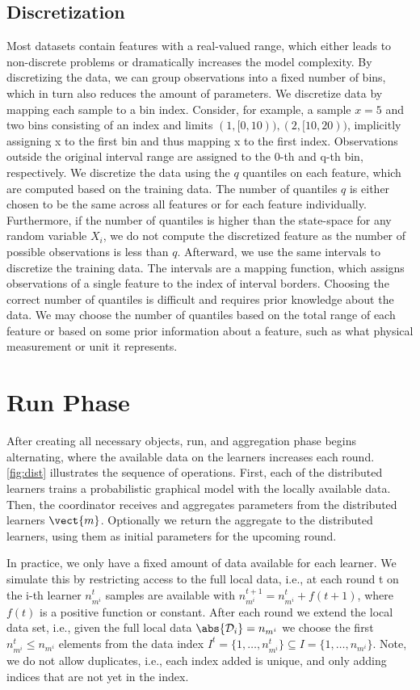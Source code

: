 \subsection{Discretization}
Most datasets contain features with a real-valued range, which either leads to non-discrete problems or dramatically increases the model complexity.
By discretizing the data, we can group observations into a fixed number of bins, which in turn also reduces the amount of parameters.
We discretize data by mapping each sample to a bin index.
Consider, for example, a sample $x=5$ and two bins consisting of an index and limits $(1,[0,10)),(2,[10,20))$, implicitly assigning x to the first bin and thus mapping x to the first index. 
Observations outside the original interval range are assigned to the 0-th and q-th bin, respectively.
We discretize the data using the $q$ quantiles on each feature, which are computed based on the training data. 
The number of quantiles $q$ is either chosen to be the same across all features or for each feature individually.
Furthermore, if the number of quantiles is higher than the state-space for any random variable $X_i$, we do not compute the discretized feature as the number of possible observations is less than $q$.
Afterward, we use the same intervals to discretize the training data.
The intervals are a mapping function, which assigns observations of a single feature to the index of interval borders. 
Choosing the correct number of quantiles is difficult and requires prior knowledge about the data.
We may choose the number of quantiles based on the total range of each feature or based on some prior information about a feature, such as what physical measurement or unit it represents.

\section{Run Phase}
After creating all necessary objects, run, and aggregation phase begins alternating, where the available data on the learners increases each round.
\autoref{fig:dist} illustrates the sequence of operations.
First, each of the distributed learners trains a probabilistic graphical model with the locally available data.  
Then, the coordinator receives and aggregates parameters from the distributed learners $\vect{m}$. 
Optionally we return the aggregate to the distributed learners, using them as initial parameters for the upcoming round.

In practice, we only have a fixed amount of data available for each learner.
We simulate this by restricting access to the full local data, i.e., at each round t on the i-th learner  $n^{t}_{m^i}$ samples are available with $n^{t+1}_{m^i} = n^{t}_{m^i} + f(t+1)$, where $f(t)$ is a positive function or constant.
After each round we extend the local data set, i.e., given the full local data $\abs{\mathcal{D}_i} = n_{m^i}$  we choose the first  $ n^{t}_{m^i} \leq n_{m^i}$ elements from the data index $I^t =\{1, \ldots, n^{t}_{m^i}\} \subseteq I = \{1, \ldots, n_{m^i}\}$. 
Note, we do not allow duplicates, i.e., each index added is unique, and only adding indices that are not yet in the index.

